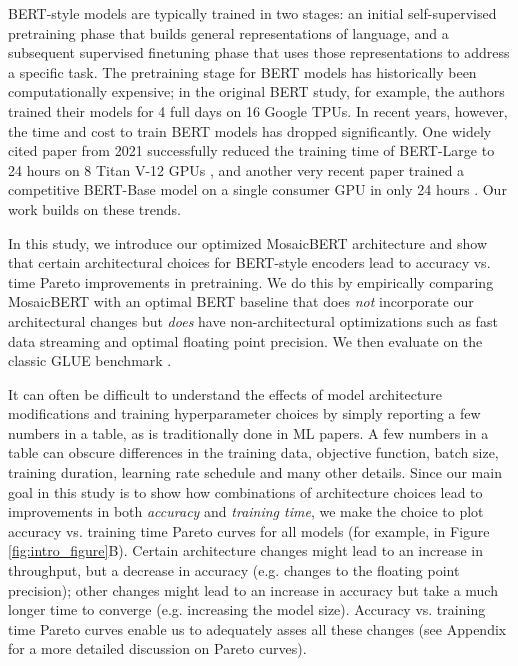 \documentclass{article}
\begin{document}
BERT-style models are typically trained in two stages: an initial self-supervised pretraining phase that builds general representations of language, and a subsequent supervised finetuning phase that uses those representations to address a specific task.
The pretraining stage for BERT models has historically been computationally expensive; in the original BERT study, for example, the authors trained their models for 4 full days on 16 Google TPUs. 
In recent years, however, the time and cost to train BERT models has dropped significantly. One widely cited paper from 2021 successfully reduced the training time of BERT-Large to 24 hours on 8 Titan V-12 GPUs \citep{izsak2021train}, and another very recent paper trained a competitive BERT-Base model on a single consumer GPU in only 24 hours \citep{geiping2023cramming}. Our work builds on these trends.

In this study, we introduce our optimized MosaicBERT architecture and show that certain architectural choices for BERT-style encoders lead to accuracy vs. time Pareto improvements in pretraining. We do this by empirically comparing MosaicBERT with an optimal BERT baseline that does \textit{not} incorporate our architectural changes but \textit{does} have non-architectural optimizations such as fast data streaming and optimal floating point precision. We then evaluate on the classic GLUE benchmark \citep{wang2018glue}.

It can often be difficult to understand the effects of model architecture modifications and training hyperparameter choices by simply reporting a few numbers in a table, as is traditionally done in ML papers. A few numbers in a table can obscure differences in the training data, objective function, batch size, training duration, learning rate schedule and many other details. Since our main goal in this study is to show how combinations of architecture choices lead to improvements in both \textit{accuracy} and \textit{training time}, we make the choice to plot accuracy vs. training time Pareto curves for all models (for example, in Figure \ref{fig:intro_figure}B). Certain architecture changes might lead to an increase in throughput, but a decrease in accuracy (e.g. changes to the floating point precision); other changes might lead to an increase in accuracy but take a much longer time to converge (e.g. increasing the model size). Accuracy vs. training time Pareto curves enable us to adequately asses all these changes (see Appendix for a more detailed discussion on Pareto curves).
\end{document}

